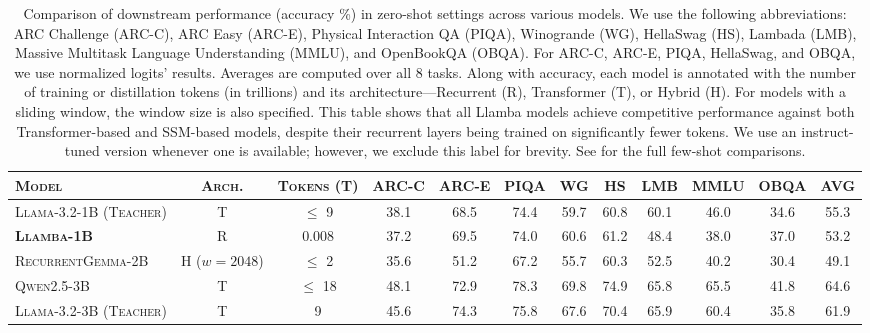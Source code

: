 \begin{table}[H]
\centering
\small
\setlength{\tabcolsep}{3.1pt}
\caption{
Comparison of downstream performance (accuracy \%) in zero-shot settings across various models. 
We use the following abbreviations: 
ARC Challenge (ARC-C), 
ARC Easy (ARC-E), 
Physical Interaction QA (PIQA), 
Winogrande (WG), 
HellaSwag (HS), 
Lambada (LMB), 
Massive Multitask Language Understanding (MMLU), 
and OpenBookQA (OBQA). 
For ARC-C, ARC-E, PIQA, HellaSwag, and OBQA, we use normalized logits' results. 
Averages are computed over all 8 tasks. 
Along with accuracy, each model is annotated with the number of training or distillation tokens (in trillions) and its architecture—Recurrent (R), Transformer (T), or Hybrid (H). For models with a sliding window, the window size is also specified.
This table shows that all Llamba models achieve competitive performance against both Transformer-based and SSM-based models, despite their recurrent layers being trained on significantly fewer tokens.
We use an instruct-tuned version whenever one is available; however, we exclude this label for brevity.
See  for the full few-shot comparisons.
}
\label{tab:performance_comparison}
\begin{tabular}{l c c c c c c c c c c c}
\toprule
\textsc{Model} & 
\textsc{Arch.} & 
\textsc{Tokens (T)} & \textsc{ARC-C} & 
\textsc{ARC-E} & \textsc{PIQA}  & 
\textsc{WG} & \textsc{HS} & 
\textsc{LMB} & \textsc{MMLU} & 
\textsc{OBQA} & \textbf{AVG} \\

\midrule

\textsc{Llama-3.2-1B (Teacher)} & T
& $\le$ 9   & 38.1 & 68.5 & 74.4 & 59.7 & 60.8 & 60.1 & 46.0 & 34.6 & 55.3 \\

\textbf{\textsc{Llamba-1B}} & R
& 0.008     & 37.2 & 69.5 & 74.0 & 60.6 & 61.2 & 48.4 & 38.0 & 37.0 & 53.2 \\

\textsc{RecurrentGemma-2B} & H ($w=2048$)
& $\le$ 2   & 35.6 & 51.2 & 67.2 & 55.7 & 60.3 & 52.5 & 40.2 & 30.4 & 49.1 \\

\midrule

\textsc{Qwen2.5-3B} & T
& $\le$ 18  & 48.1 & 72.9 & 78.3 & 69.8 & 74.9 & 65.8 & 65.5 & 41.8 & 64.6 \\

\textsc{Llama-3.2-3B (Teacher)} & T
& 9         & 45.6 & 74.3 & 75.8 & 67.6 & 70.4 & 65.9 & 60.4 & 35.8 & 61.9 \\


\end{tabular}
\end{table}
